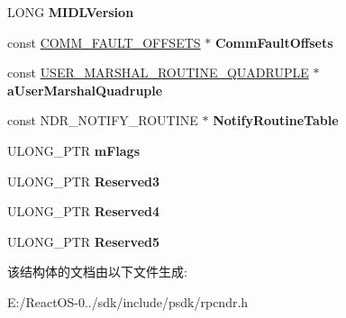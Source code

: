 \begin{DoxyCompactItemize}
\item 
\mbox{\label{struct___m_i_d_l___s_t_u_b___d_e_s_c_a96e63c07144901cc9886b826c1e75775}} 
L\+O\+NG {\bfseries M\+I\+D\+L\+Version}
\item 
\mbox{\label{struct___m_i_d_l___s_t_u_b___d_e_s_c_ac1cc77ec4eb2ad6bdde51f3bc430ea57}} 
const \hyperlink{struct___c_o_m_m___f_a_u_l_t___o_f_f_s_e_t_s}{C\+O\+M\+M\+\_\+\+F\+A\+U\+L\+T\+\_\+\+O\+F\+F\+S\+E\+TS} $\ast$ {\bfseries Comm\+Fault\+Offsets}
\item 
\mbox{\label{struct___m_i_d_l___s_t_u_b___d_e_s_c_ac863deceb785238df4686afc6c460e2c}} 
const \hyperlink{struct___u_s_e_r___m_a_r_s_h_a_l___r_o_u_t_i_n_e___q_u_a_d_r_u_p_l_e}{U\+S\+E\+R\+\_\+\+M\+A\+R\+S\+H\+A\+L\+\_\+\+R\+O\+U\+T\+I\+N\+E\+\_\+\+Q\+U\+A\+D\+R\+U\+P\+LE} $\ast$ {\bfseries a\+User\+Marshal\+Quadruple}
\item 
\mbox{\label{struct___m_i_d_l___s_t_u_b___d_e_s_c_a6d81b684484e50f5e43df0c1b6b7682a}} 
const N\+D\+R\+\_\+\+N\+O\+T\+I\+F\+Y\+\_\+\+R\+O\+U\+T\+I\+NE $\ast$ {\bfseries Notify\+Routine\+Table}
\item 
\mbox{\label{struct___m_i_d_l___s_t_u_b___d_e_s_c_a14bdb18e8690f2c32efa21c8de961394}} 
U\+L\+O\+N\+G\+\_\+\+P\+TR {\bfseries m\+Flags}
\item 
\mbox{\label{struct___m_i_d_l___s_t_u_b___d_e_s_c_a2e310a43b7831974d11b96503fab0b2a}} 
U\+L\+O\+N\+G\+\_\+\+P\+TR {\bfseries Reserved3}
\item 
\mbox{\label{struct___m_i_d_l___s_t_u_b___d_e_s_c_a82f9fc0bf860b41e69a3987137544552}} 
U\+L\+O\+N\+G\+\_\+\+P\+TR {\bfseries Reserved4}
\item 
\mbox{\label{struct___m_i_d_l___s_t_u_b___d_e_s_c_a339272eedd7b2e50d4be194366c5254e}} 
U\+L\+O\+N\+G\+\_\+\+P\+TR {\bfseries Reserved5}
\end{DoxyCompactItemize}


该结构体的文档由以下文件生成\+:\begin{DoxyCompactItemize}
\item 
E\+:/\+React\+O\+S-\/0../sdk/include/psdk/rpcndr.\+h\end{DoxyCompactItemize}
